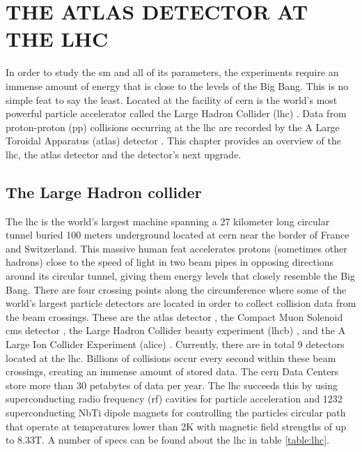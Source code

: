 \begingroup
\clearpage%
\let\clearpage\relax%
\vspace*{-16pt}%
\chapter[THE ATLAS DETECTOR AT THE LHC]{THE ATLAS DETECTOR AT THE LHC}
\endgroup

In order to study the \gls{sm} and all of its parameters, the experiments require an immense amount of energy 
that is close to the levels of the Big Bang. This is no simple feat to say the least. Located at the facility of \gls{cern}
is the world's most powerful particle accelerator called the Large Hadron Collider (\gls{lhc}) \cite{LHC}. Data from 
proton-proton (\gls{pp}) collisions occurring at the \gls{lhc} are recorded by the A Large Toroidal Apparatus (\gls{atlas}) detector \cite{atlas}.
This chapter provides an overview of the \gls{lhc}, the \gls{atlas} detector and the detector's next upgrade.

\section{The Large Hadron collider}

The \gls{lhc} is the world's largest machine spanning a 27 kilometer long circular tunnel buried 100 meters underground 
located at \gls{cern} near the border of France and Switzerland. This massive human feat accelerates protons (sometimes other hadrons)
close to the speed of light in two beam pipes in opposing directions around its circular tunnel, giving them energy levels that closely 
resemble the Big Bang. There are four crossing points along the circumference where some of the world's largest 
particle detectors are located in order to collect collision data from the beam crossings. These are the \gls{atlas} detector
\cite{atlas}, the Compact Muon Solenoid \gls{cms} detector \cite{cms}, the Large Hadron Collider beauty experiment (\gls{lhcb}) \cite{lhcb}, 
and the A Large Ion Collider Experiment (\gls{alice}) \cite{alice}. Currently, there are in total 9 detectors located at the 
\gls{lhc}. Billions of collisions occur every second within these beam crossings, creating an immense amount of 
stored data. The \gls{cern} Data Centers store more than 30 petabytes of data per year. The \gls{lhc}
succeeds this by using superconducting radio frequency (\gls{rf}) cavities for particle acceleration and 1232 superconducting 
NbTi dipole magnets for controlling the particles circular path that operate at temperatures lower than 2K with magnetic
field strengths of up to 8.33T. A number of specs can be found about the \gls{lhc} in table \ref{table:lhc}.

